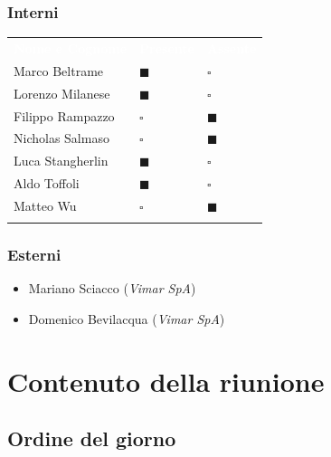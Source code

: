 \documentclass[12pt,a4paper]{article}
\newcommand{\tightlist}{\setlength{\itemsep}{1pt}\setlength{\parskip}{0pt}}
\begin{document}
\hypertarget{interni}{%
\subsubsection{Interni}}

\begin{center}
\begin{tabularx}{\linewidth}{>{\raggedright\arraybackslash}X>{\centering\arraybackslash}p{2.5cm}>{\centering\arraybackslash}p{2.5cm}}
\rowcolor{bfblue}\textcolor{white}{\textbf{Nome e Cognome}} & \textcolor{white}{\textbf{Presente}} & \textcolor{white}{\textbf{Assente}} \\
Marco Beltrame & $\blacksquare$  & $\square$ \\ \arrayrulecolor{bfline}\hline
Lorenzo Milanese & $\blacksquare$ & $\square$ \\ \arrayrulecolor{bfline}\hline
Filippo Rampazzo & $\square$ & $\blacksquare$ \\ \arrayrulecolor{bfline}\hline
Nicholas Salmaso & $\square$ & $\blacksquare$ \\ \arrayrulecolor{bfline}\hline
Luca Stangherlin & $\blacksquare$ & $\square$ \\ \arrayrulecolor{bfline}\hline
Aldo Toffoli & $\blacksquare$ & $\square$ \\ \arrayrulecolor{bfline}\hline
Matteo Wu & $\square$ & $\blacksquare$ \\ \arrayrulecolor{bfline}\hline
\end{tabularx}
\end{center}

\hypertarget{esterni}{%
\newpage
\subsubsection{Esterni}}

\begin{itemize}
\tightlist
\item
  Mariano Sciacco (\emph{Vimar SpA})
\item
  Domenico Bevilacqua (\emph{Vimar SpA})
\end{itemize}


  
\hypertarget{contenuto-della-riunione}{%
\section{Contenuto della riunione}}

\hypertarget{ordine-del-giorno}{%
\subsection{Ordine del giorno}}
\end{document}
